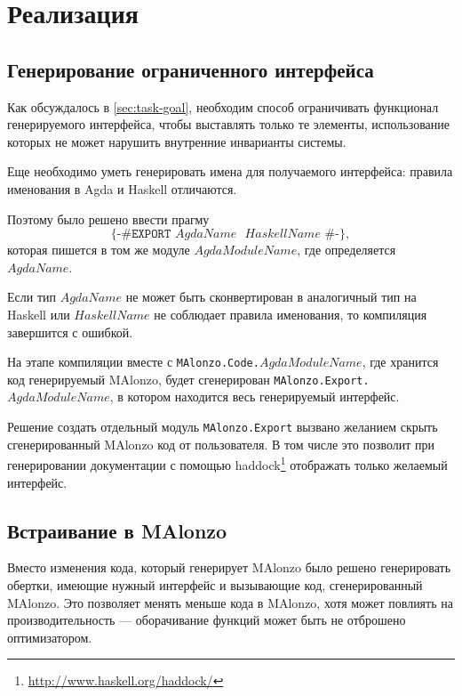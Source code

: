 \section{Реализация}

\subsection{Генерирование ограниченного интерфейса}

Как обсуждалось в \ref{sec:task-goal}, необходим способ ограничивать
функционал генерируемого интерфейса, чтобы выставлять только те элементы,
использование которых не может нарушить внутренние инварианты системы.

Еще необходимо уметь генерировать имена для получаемого интерфейса:
правила именования в Agda и Haskell отличаются.

Поэтому было решено ввести прагму
\[
\texttt{\{-\# EXPORT \(AgdaName\) \(HaskellName\) \#-\}},
\]
которая пишется в том же модуле \(AgdaModuleName\), где определяется \(AgdaName\).

Если тип \(AgdaName\) не может быть сконвертирован в аналогичный тип на Haskell
или \(HaskellName\) не соблюдает правила именования, то компиляция завершится с ошибкой.

На этапе компиляции вместе с \texttt{MAlonzo.Code.\(AgdaModuleName\)}, где хранится
код генерируемый MAlonzo, будет сгенерирован \texttt{MAlonzo.Export.\(AgdaModuleName\)},
в котором находится весь генерируемый интерфейс.

Решение создать отдельный модуль \texttt{MAlonzo.Export} вызвано желанием скрыть
сгенерированный MAlonzo код от пользователя. В том числе это позволит
при генерировании документации с помощью haddock\footnote{\url{http://www.haskell.org/haddock/}}
отображать только желаемый интерфейс.

\subsection{Встраивание в MAlonzo}

Вместо изменения кода, который генерирует MAlonzo было решено генерировать
обертки, имеющие нужный интерфейс и вызывающие код, сгенерированный MAlonzo.
Это позволяет менять меньше кода в MAlonzo, хотя может повлиять на производительность ---
оборачивание функций может быть не отброшено оптимизатором.

